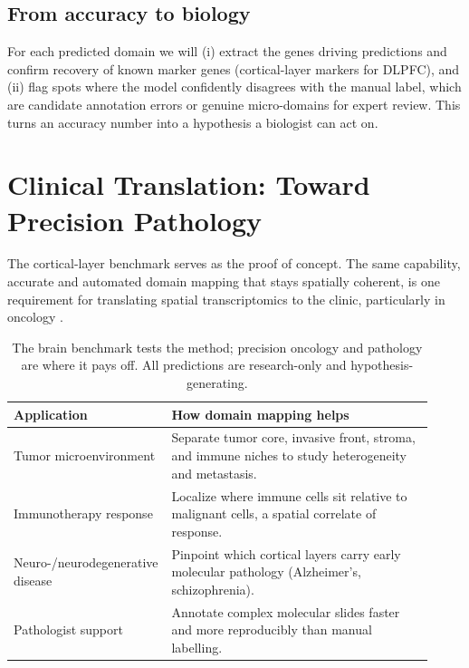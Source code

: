 \documentclass[11pt]{article}
\begin{document}
\subsection{From accuracy to biology}
For each predicted domain we will (i) extract the genes driving predictions and
confirm recovery of known marker genes (cortical-layer markers for DLPFC), and
(ii) flag spots where the model confidently disagrees with the manual label,
which are candidate annotation errors or genuine micro-domains for expert review.
This turns an accuracy number into a hypothesis a biologist can act on.

\section{Clinical Translation: Toward Precision Pathology}

The cortical-layer benchmark serves as the proof of concept. The same capability,
accurate and automated domain mapping that stays spatially coherent, is one
requirement for translating spatial transcriptomics to the clinic, particularly
in oncology \cite{cilento2024}.

\begin{table}[H]
\centering\small
\begin{tabular}{>{\raggedright\arraybackslash}p{0.30\linewidth} >{\raggedright\arraybackslash}p{0.62\linewidth}}
\toprule
\rowcolor{sriblue}\color{white}\textbf{Application} & \color{white}\textbf{How domain mapping helps}\\
\midrule
\rowcolor{srirow} Tumor microenvironment & Separate tumor core, invasive front, stroma, and immune niches to study heterogeneity and metastasis.\\
Immunotherapy response & Localize where immune cells sit relative to malignant cells, a spatial correlate of response.\\
\rowcolor{srirow} Neuro-/neurodegenerative disease & Pinpoint which cortical layers carry early molecular pathology (Alzheimer's, schizophrenia).\\
Pathologist support & Annotate complex molecular slides faster and more reproducibly than manual labelling.\\
\bottomrule
\end{tabular}
\caption{The brain benchmark tests the method; precision oncology and pathology
are where it pays off. All predictions are research-only and hypothesis-generating.}
\label{tab:clinical}
\end{table}
\end{document}
